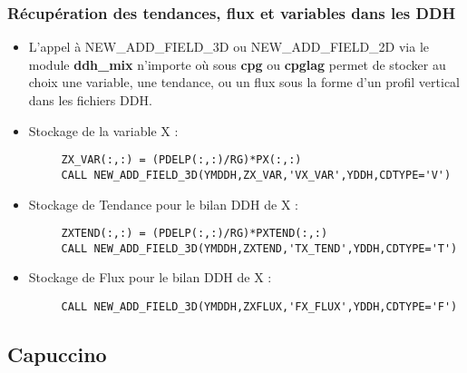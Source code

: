 \documentclass[aspectratio=169]{beamer}
\begin{document}
\begin{frame}[fragile]
\frametitle{\normalsize Récupération des tendances, flux et variables dans les DDH}
\vspace{-0.25cm}
\begin{alertblock}{} 
\footnotesize
\begin{itemize}
\item L'appel à NEW\_ADD\_FIELD\_3D ou NEW\_ADD\_FIELD\_2D via le module \textbf{ddh\_mix} 
n'importe où sous \textbf{cpg} ou \textbf{cpglag} permet de stocker au choix 
une variable, une tendance, ou un flux sous la forme d'un profil vertical 
dans les fichiers DDH.  
\end{itemize}
\end{alertblock}

\begin{exampleblock}{} 
\begin{footnotesize}
\begin{itemize}
\item Stockage de la variable X :
\begin{verbatim}
     ZX_VAR(:,:) = (PDELP(:,:)/RG)*PX(:,:)  
     CALL NEW_ADD_FIELD_3D(YMDDH,ZX_VAR,'VX_VAR',YDDH,CDTYPE='V')
\end{verbatim}
\item Stockage de Tendance pour le bilan DDH de X :
\begin{verbatim}
     ZXTEND(:,:) = (PDELP(:,:)/RG)*PXTEND(:,:)
     CALL NEW_ADD_FIELD_3D(YMDDH,ZXTEND,'TX_TEND',YDDH,CDTYPE='T')
\end{verbatim}
 \item Stockage de Flux pour le bilan DDH de X :
\begin{verbatim}
     CALL NEW_ADD_FIELD_3D(YMDDH,ZXFLUX,'FX_FLUX',YDDH,CDTYPE='F')
\end{verbatim}
\end{itemize}
\end{footnotesize}

\end{exampleblock}

\end{frame}


\subsection{Capuccino}
\end{document}
